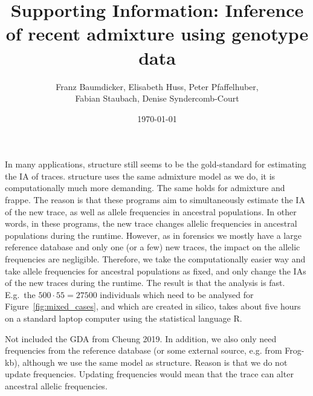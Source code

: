 \documentclass[12pt]{article}
\theoremstyle{definition}
\begin{document}
In many applications, {\sc structure} still seems to be the
gold-standard for estimating the IA of traces. {\sc structure} uses
the same admixture model as we do, it is computationally much more
demanding. The same holds for {\sc admixture} and {\sc frappe}. The
reason is that these programs aim to simultaneously estimate the IA of
the new trace, as well as allele frequencies in ancestral
populations. In other words, in these programs, the new trace changes
allelic frequencies in ancestral populations during the
runtime. However, as in forensics we mostly have a large reference
database and only one (or a few) new traces, the impact on the allelic
frequencies are negligible. Therefore, we take the computationally
easier way and take allele frequencies for ancestral populations as
fixed, and only change the IAs of the new traces during the
runtime. The result is that the analysis is fast. E.g.\ the
$500\cdot 55 = 27500$ individuals which need to be analysed for
Figure~\ref{fig:mixed_cases}, and which are created in silico, takes
about five hours on a standard laptop computer using the statistical
language R.



Not included the GDA from Cheung 2019. In addition, we also only need
frequencies from the reference database (or some external source,
e.g. from Frog-kb), although we use the same model as
structure. Reason is that we do not update frequencies. Updating
frequencies would mean that the trace can alter ancestral allelic
frequencies.



 

\newpage
\setcounter{page}{1}
\setcounter{section}{0}
\thispagestyle{empty}

\begin{center}
 \title{\LARGE Supporting Information: Inference
  of recent admixture using genotype data}

~~

\author{\sc Franz Baumdicker, Elisabeth Huss, Peter Pfaffelhuber,\\
  \sc Fabian Staubach, Denise Syndercomb-Court}

~

\date{\today}

\maketitle
  
\end{center}
\end{document}
